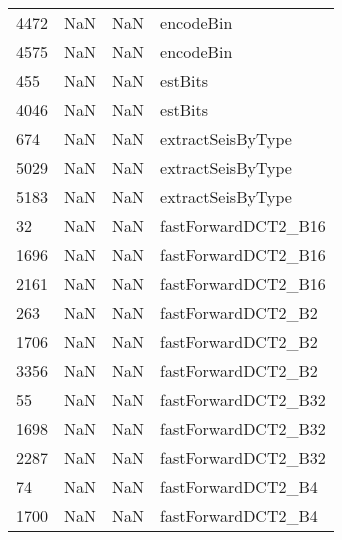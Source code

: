 \begin{tabular}{llll}
4472 &                   NaN &                        NaN &                                 encodeBin \\
4575 &                   NaN &                        NaN &                                 encodeBin \\
455  &                   NaN &                        NaN &                                   estBits \\
4046 &                   NaN &                        NaN &                                   estBits \\
674  &                   NaN &                        NaN &                         extractSeisByType \\
5029 &                   NaN &                        NaN &                         extractSeisByType \\
5183 &                   NaN &                        NaN &                         extractSeisByType \\
32   &                   NaN &                        NaN &                       fastForwardDCT2\_B16 \\
1696 &                   NaN &                        NaN &                       fastForwardDCT2\_B16 \\
2161 &                   NaN &                        NaN &                       fastForwardDCT2\_B16 \\
263  &                   NaN &                        NaN &                        fastForwardDCT2\_B2 \\
1706 &                   NaN &                        NaN &                        fastForwardDCT2\_B2 \\
3356 &                   NaN &                        NaN &                        fastForwardDCT2\_B2 \\
55   &                   NaN &                        NaN &                       fastForwardDCT2\_B32 \\
1698 &                   NaN &                        NaN &                       fastForwardDCT2\_B32 \\
2287 &                   NaN &                        NaN &                       fastForwardDCT2\_B32 \\
74   &                   NaN &                        NaN &                        fastForwardDCT2\_B4 \\
1700 &                   NaN &                        NaN &                        fastForwardDCT2\_B4 \\

\end{tabular}
